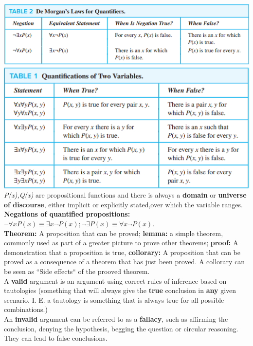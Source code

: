 \documentclass[12pt]{article}
\begin{document}
\includegraphics[scale=0.8]{de_morgan_quantifier_laws} \\
\includegraphics[scale=0.8]{multi_variable_quantifiers} \\
\textit{P(x),Q(x)} are propositional functions and there is always a \textbf{domain} or \textbf{universe of discourse}, either implicit or explicitly stated,over which the variable ranges. \\
\medskip
\textbf{Negations of quantified propositions:} $\neg \forall xP(x)\equiv \exists x\neg P(x); \neg \exists P(x) \equiv \forall x \neg P(x)$. \\
\medskip
\textbf{Theorem:} A proposition that can be proved; \textbf{lemma:} a simple theorem, commonly used as part of a greater picture to prove other theorems; \textbf{proof:} A demonstration that a proposition is true, \textbf{collorary:} A proposition that can be proved as a consequence of a theorem that has just been proved. A collorary can be seen as ``Side effects`` of the prooved theorem. \\
\medskip
A \textbf{valid} argument is an argument using correct rules of inference based on tautologies (something that will always give the \textbf{true} conclusion in \textbf{any} given scenario. I. E. a tautology is something that is always true for all possible combinations.) \\
An \textbf{invalid} argument can be referred to as a \textbf{fallacy}, such as affirming the conclusion, denying the hypothesis, begging the question or circular reasoning. They can lead to false conclusions. \\
\end{document}
